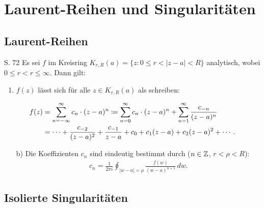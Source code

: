 \section{Laurent-Reihen und Singularitäten}


\subsection{Laurent-Reihen}

\begin{satz}{S. 72}
  \label{satz:7_1}
  Es sei $f$ im Kreisring $K_{r,R}(a) = \{ z : 0 \leq r < |z-a| < R \}$ analytisch, wobei $0 \leq r < r \leq \infty$.
  Dann gilt:
  \begin{enumerate}[label=\alph*)]
    \item $f(z)$ lässt sich für alle $z \in K_{r,R}(a)$ als  schreiben:
  \end{enumerate}
  \vspace{-1em}
  \begin{align}
    f(z)
      &= \sum_{n=-\infty}^{\infty} c_n \cdot (z-a)^n
       \coloneqq \sum_{n=0}^{\infty} c_n \cdot (z-a)^n + \sum_{n=1}^{\infty} \frac{c_{-n}}{(z-a)^n}
       \notag\\
      &= \cdots
        + \frac{c_{-2}}{(z-a)^2}
        + \frac{c_{-1}}{z-a}
        + c_0
        + c_1 (z-a)
        + c_2 (z-a)^2
        + \cdots
        .
  \end{align}
  \begin{enumerate}[label=\alph*)]
    \item[b)] Die Koeffizienten $c_n$ sind eindeutig bestimmt durch ($n \in \mathbb{Z}$, $r < \rho < R$):
      \begin{align}
        \label{eq:koeff_c_n}
        c_n = \frac{1}{2 \pi i} \oint_{|w-a| = \rho} \frac{f(w)}{(w-a)^{n+1}} \, dw .
      \end{align}
  \end{enumerate}
\end{satz}

%



\subsection{Isolierte Singularitäten}

